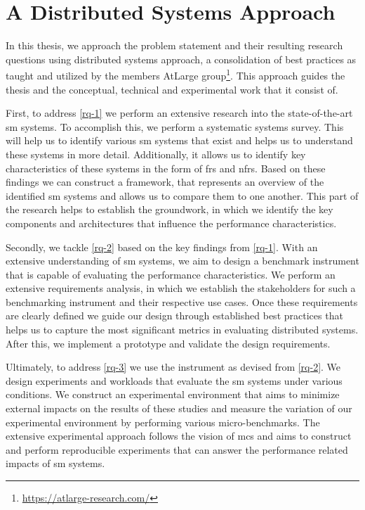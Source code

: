 \section{A Distributed Systems Approach}
\label{sec:approach}

In this thesis, we approach the problem statement and their resulting research questions using distributed systems approach, a consolidation of best practices as taught and utilized by the members AtLarge group\footnote{\url{https://atlarge-research.com/}}. This approach guides the thesis and the conceptual, technical and experimental work that it consist of.

First, to address \ref{rq-1} we perform an extensive research into the state-of-the-art \gls{sm} systems. To accomplish this, we perform a systematic systems survey. This will help us to identify various \gls{sm} systems that exist and helps us to understand these systems in more detail. Additionally, it allows us to identify key characteristics of these systems in the form of \glspl{fr} and \glspl{nfr}. Based on these findings we can construct a framework, that represents an overview of the identified \gls{sm} systems and allows us to compare them to one another. This part of the research helps to establish the groundwork, in which we identify the key components and architectures that influence the performance characteristics.

Secondly, we tackle \ref{rq-2} based on the key findings from \ref{rq-1}. With an extensive understanding of \gls{sm} systems, we aim to design a benchmark instrument that is capable of evaluating the performance characteristics. We perform an extensive requirements analysis, in which we establish the stakeholders for such a benchmarking instrument and their respective use cases. Once these requirements are clearly defined we guide our design through established best practices that helps us to capture the most significant metrics in evaluating distributed systems. After this, we implement a prototype and validate the design requirements.


Ultimately, to address \ref{rq-3} we use the instrument as devised from \ref{rq-2}. We design experiments and workloads that evaluate the \gls{sm} systems under various conditions. We construct an experimental environment that aims to minimize external impacts on the results of these studies and measure the variation of our experimental environment by performing various micro-benchmarks. The extensive experimental approach follows the vision of \gls{mcs} and aims to construct and perform reproducible experiments that can answer the performance related impacts of \gls{sm} systems.